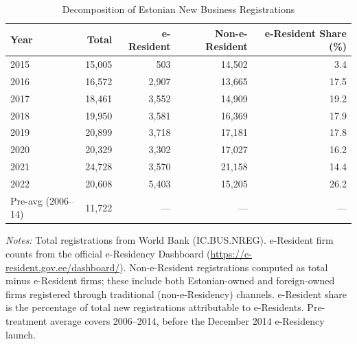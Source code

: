 \begin{table}[H]
\centering
\caption{Decomposition of Estonian New Business Registrations}
\label{tab:decomp}
\begin{threeparttable}
\begin{tabular}{lrrrr}
\toprule
Year & Total & e-Resident & Non-e-Resident & e-Resident Share (\%) \\
\midrule
2015 & 15,005 & 503 & 14,502 & 3.4 \\
2016 & 16,572 & 2,907 & 13,665 & 17.5 \\
2017 & 18,461 & 3,552 & 14,909 & 19.2 \\
2018 & 19,950 & 3,581 & 16,369 & 17.9 \\
2019 & 20,899 & 3,718 & 17,181 & 17.8 \\
2020 & 20,329 & 3,302 & 17,027 & 16.2 \\
2021 & 24,728 & 3,570 & 21,158 & 14.4 \\
2022 & 20,608 & 5,403 & 15,205 & 26.2 \\
\midrule
Pre-avg (2006--14) & 11,722 & --- & --- & --- \\
\bottomrule
\end{tabular}
\begin{tablenotes}[flushleft]\sloppy
\footnotesize
\item \textit{Notes:} Total registrations from World Bank (IC.BUS.NREG). e-Resident firm counts from the official e-Residency Dashboard (\url{https://e-resident.gov.ee/dashboard/}). Non-e-Resident registrations computed as total minus e-Resident firms; these include both Estonian-owned and foreign-owned firms registered through traditional (non-e-Residency) channels. e-Resident share is the percentage of total new registrations attributable to e-Residents. Pre-treatment average covers 2006--2014, before the December 2014 e-Residency launch.
\end{tablenotes}
\end{threeparttable}
\end{table}
